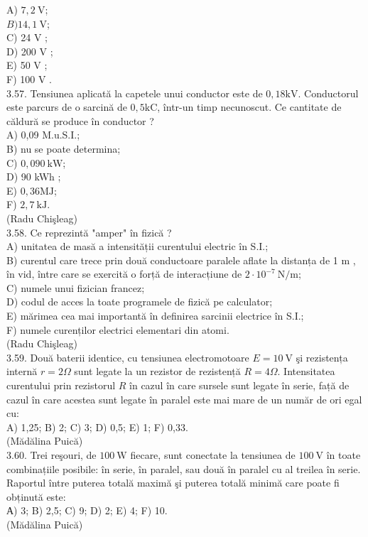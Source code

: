 \documentclass[10pt]{article}
\begin{document}
A) $7,2 \mathrm{~V}$;\\
$B) 14,1 \mathrm{~V}$;\\
C) 24 V ;\\
D) 200 V ;\\
E) 50 V ;\\
F) 100 V .\\
3.57. Tensiunea aplicată la capetele unui conductor este de $0,18 \mathrm{kV}$. Conductorul este parcurs de o sarcină de $0,5 \mathrm{kC}$, într-un timp necunoscut. Ce cantitate de căldură se produce în conductor ?\\
A) 0,09 M.u.S.I.;\\
B) nu se poate determina;\\
C) $0,090 \mathrm{~kW}$;\\
D) 90 kWh ;\\
E) $0,36 \mathrm{MJ}$;\\
F) $2,7 \mathrm{~kJ}$.\\
(Radu Chişleag)\\

3.58. Ce reprezintă "amper" în fizică ?\\
A) unitatea de masă a intensității curentului electric în S.I.;\\
B) curentul care trece prin două conductoare paralele aflate la distanța de 1 m , în vid, între care se exercită o forță de interacțiune de $2 \cdot 10^{-7} \mathrm{~N} / \mathrm{m}$;\\
C) numele unui fizician francez;\\
D) codul de acces la toate programele de fizică pe calculator;\\
E) mărimea cea mai importantă în definirea sarcinii electrice în S.I.;\\
F) numele curenților electrici elementari din atomi.\\
(Radu Chişleag)\\

3.59. Două baterii identice, cu tensiunea electromotoare $E=10 \mathrm{~V}$ şi rezistența internă $r=2 \Omega$ sunt legate la un rezistor de rezistență $R=4 \Omega$. Intensitatea curentului prin rezistorul $R$ în cazul în care sursele sunt legate în serie, față de cazul în care acestea sunt legate în paralel este mai mare de un număr de ori egal cu:\\ A) 1,25; B) 2; C) 3; D) 0,5; E) 1; F) 0,33.\\ (Mădălina Puică)\\

3.60. Trei reşouri, de $100 \mathrm{~W}$ fiecare, sunt conectate la tensiunea de $100 \mathrm{~V}$ în toate combinațiile posibile: în serie, în paralel, sau două în paralel cu al treilea în serie. Raportul între puterea totală maximă şi puterea totală minimă care poate fi obținută este:\\ А) 3; B) 2,5; C) 9; D) 2; E) 4; F) 10.\\ (Mădălina Puică)\\
\end{document}
